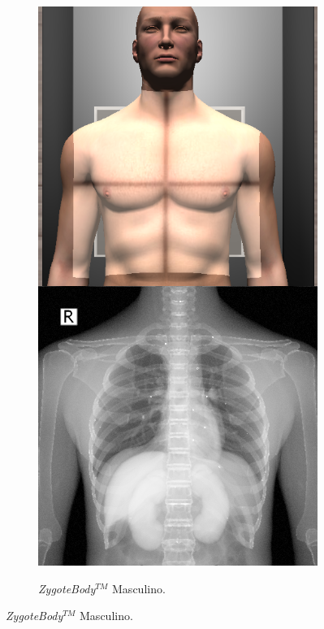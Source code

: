 \begin{figure}[ht]
    \begin{subfigure}[b]{0.24\linewidth}
        \centering
        {\includegraphics[width=\linewidth]{IMG/zygoteex.png}}
        \caption{\emph{ZygoteBody}$^{TM}$ Masculino.}

\end{subfigure}
\end{figure}
